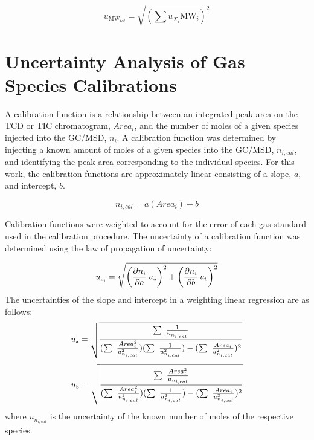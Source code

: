 \documentclass[12pt]{article}
\begin{document}
\begin{equation}\label{eq:Uncertainty_Total_MW}
	u_{\scriptscriptstyle \textrm{MW}_{tot}}=\sqrt{\left(\sum{{u_{\scriptscriptstyle \bar{X}_{i}}}{{\textrm{MW}_{i}}}}\right)^2}
\end{equation}

\pagebreak

\section{Uncertainty Analysis of Gas Species Calibrations}\label{sec:Uncertainty Analysis of Gas Species Calibrations}
A calibration function is a relationship between an integrated peak area on the TCD or TIC chromatogram, $Area_{i}$, and the number of moles of a given species injected into the GC/MSD, $n_{i}$. A calibration function was determined by injecting a known amount of moles of a given species into the GC/MSD, $n_{i,cal}$, and identifying the peak area corresponding to the individual species. For this work, the calibration functions are approximately linear consisting of a slope, $a$, and intercept, $b$.

\begin{equation}
\label{eq:Calibration Curve}
n_{i,cal} = a(Area_{i})+b
\end{equation}

Calibration functions were weighted to account for the error of each gas standard used in the calibration procedure. The uncertainty of a calibration function was determined using the law of propagation of uncertainty:

\begin{equation}
\label{eq:Given_Moles_Uncertainty}
 u_{\rm \scriptscriptstyle n_{i}} = \sqrt{{\left( \frac{\partial n_{i}}{\partial a}\,u_{\scriptscriptstyle a} \right)}^2+{\left(\frac{\partial {n_{i}}}{\partial b}\,u_{\scriptscriptstyle b}\right)}^2}
\end{equation}
The uncertainties of the slope and intercept in a weighting linear regression are as follows:
\begin{equation}
\label{eq:Slope_Uncertainty}
u_{\rm \scriptscriptstyle a} =\sqrt{\frac{\sum~\frac{1}{u_{n_{i,cal}}}}{(\sum~\frac{Area_{i}^2}{{u_{n_{i,cal}}^2}})(\sum~\frac{1}{{u_{n_{i,cal}}^2}})-(\sum~\frac{Area_{i}}{{u_{n_{i,cal}}^2}})^2}}
\end{equation}
\begin{equation}
\label{eq:Intercept_Uncertainty}
u_{\rm \scriptscriptstyle b} =\sqrt{\frac{\sum~\frac{Area_{i}^2}{u_{n_{i,cal}}}}{(\sum~\frac{Area_{i}^2}{{u_{n_{i,cal}}^2}})(\sum~\frac{1}{{u_{n_{i,cal}}^2}})-(\sum~\frac{Area_{i}}{{u_{n_{i,cal}}^2}})^2}}
\end{equation}
where $u_{n_{i,cal}}$ is the uncertainty of the known number of moles of the respective species.
\end{document}
